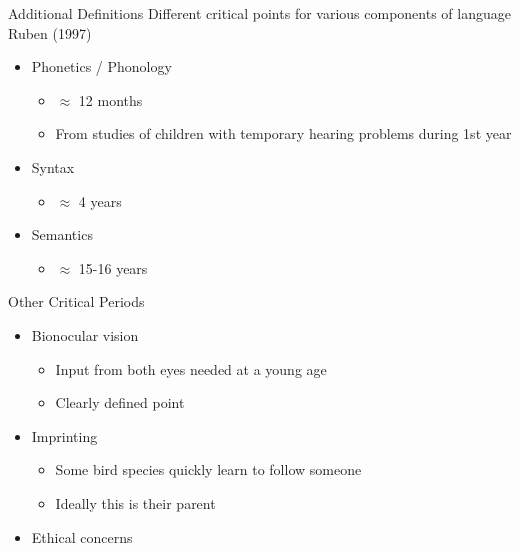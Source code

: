 \documentclass{beamer}
\begin{document}
\begin{frame}{Additional Definitions}
  Different critical points for various components of language \\
  Ruben (1997)
  \begin{itemize}
    \item Phonetics / Phonology
    \begin{itemize}
      \item $\approx$ 12 months
      \item From studies of children with temporary hearing problems during 1st year
    \end{itemize}
    \item Syntax
    \begin{itemize}
      \item $\approx$ 4 years
    \end{itemize}
    \item Semantics
    \begin{itemize}
      \item $\approx$ 15-16 years
    \end{itemize}
  \end{itemize}
\end{frame}

\begin{frame}{Other Critical Periods}
  \begin{itemize}
    \item Bionocular vision
    \begin{itemize}
      \item Input from both eyes needed at a young age
      \item Clearly defined point
    \end{itemize}
    \item Imprinting
    \begin{itemize}
      \item Some bird species quickly learn to follow someone
      \item Ideally this is their parent
    \end{itemize}
    \item Ethical concerns
  \end{itemize}
\end{frame}
\end{document}
